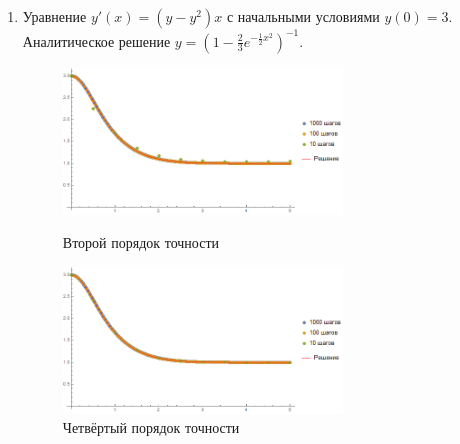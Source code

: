 \documentclass[a4paper,12pt,titlepage,finall]{article}
\begin{document}
\begin{enumerate}
\newpage
\item
Уравнение $y'(x) = (y - y^2) x$ с начальными условиями $y(0)= 3$. Аналитическое решение $y = \left( 1- \frac{2}{3} e^{-\frac{1}{2}x^2} \right)^{-1}$.
\begin{figure}[h]
\centering
\includegraphics[width=0.7\textwidth]{test_1_4_2.png}
\caption{Второй порядок точности}
\centering
\includegraphics[width=0.7\textwidth]{test_1_4_4.png}
\caption{Четвёртый порядок точности}
\end{figure}


\end{enumerate}
\end{document}
